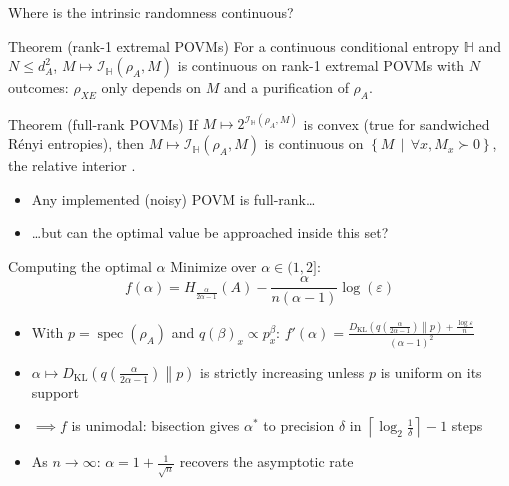 \documentclass[aspectratio=169]{beamer}
\newcommand{\scite}[1]{{\tiny\citep{#1}}}
\begin{document}
\begin{frame}{Where is the intrinsic randomness continuous?}
	\begin{block}{Theorem (rank-1 extremal POVMs)}
		For a continuous conditional entropy $\mathbb{H}$ and $N\leqslant d_A^2$, $M\mapsto\mathcal{I}_{\mathbb{H}}\left(\rho_A,M\right)$ is continuous on rank-1 extremal POVMs with $N$ outcomes: $\rho_{XE}$ only depends on $M$ and a purification of $\rho_A$.
	\end{block}
	\begin{block}{Theorem (full-rank POVMs)}
		If $M\mapsto2^{\mathcal{I}_{\mathbb{H}}\left(\rho_A,M\right)}$ is convex (true for sandwiched Rényi entropies), then $M\mapsto\mathcal{I}_{\mathbb{H}}\left(\rho_A,M\right)$ is continuous on $\left\{M\,\middle|\,\forall x, M_x\succ0\right\}$, the relative interior \scite{Roc70}.
	\end{block}
	\begin{itemize}
		\item Any implemented (noisy) POVM is full-rank\ldots
		\item \ldots but can the optimal value be approached inside this set?
	\end{itemize}
\end{frame}

\begin{frame}{Computing the optimal $\alpha$}
	Minimize over $\alpha\in(1,2]$:
	\[f(\alpha)=H_{\frac{\alpha}{2\alpha-1}}(A)-\frac{\alpha}{n(\alpha-1)}\log(\varepsilon)\]
	\begin{itemize}
		\item With $p=\operatorname{spec}(\rho_A)$ and $q(\beta)_x\propto p_x^\beta$: $f'(\alpha)=\frac{D_{\mathrm{KL}}\left(q\left(\frac{\alpha}{2\alpha-1}\right)\middle\|p\right)+\frac{\log\varepsilon}{n}}{(\alpha-1)^2}$
		\item $\alpha\mapsto D_{\mathrm{KL}}\left(q\left(\frac{\alpha}{2\alpha-1}\right)\middle\|p\right)$ is strictly increasing unless $p$ is uniform on its support
		\item $\implies f$ is unimodal: bisection gives $\alpha^*$ to precision $\delta$ in $\left\lceil\log_2\frac1\delta\right\rceil-1$ steps
		\item As $n\to\infty$: $\alpha=1+\frac{1}{\sqrt{n}}$ recovers the asymptotic rate
	\end{itemize}
\end{frame}
\end{document}
